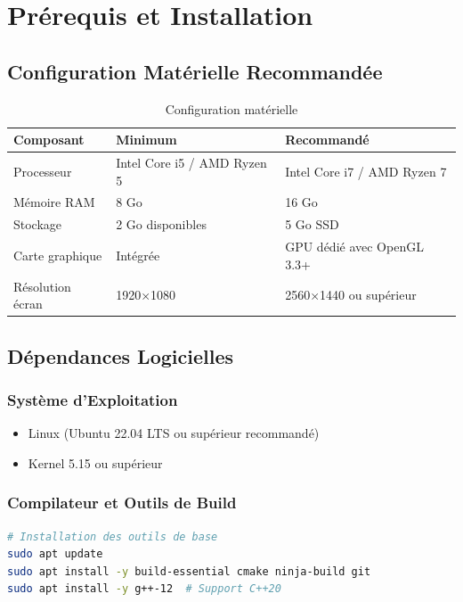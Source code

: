\documentclass[12pt,a4paper]{article}
\begin{document}
\section{Prérequis et Installation}

\subsection{Configuration Matérielle Recommandée}

\begin{table}[H]
\centering
\begin{tabular}{lll}
\toprule
\textbf{Composant} & \textbf{Minimum} & \textbf{Recommandé} \\
\midrule
Processeur & Intel Core i5 / AMD Ryzen 5 & Intel Core i7 / AMD Ryzen 7 \\
Mémoire RAM & 8 Go & 16 Go \\
Stockage & 2 Go disponibles & 5 Go SSD \\
Carte graphique & Intégrée & GPU dédié avec OpenGL 3.3+ \\
Résolution écran & 1920×1080 & 2560×1440 ou supérieur \\
\bottomrule
\end{tabular}
\caption{Configuration matérielle}
\end{table}

\subsection{Dépendances Logicielles}

\subsubsection{Système d'Exploitation}
\begin{itemize}
    \item Linux (Ubuntu 22.04 LTS ou supérieur recommandé)
    \item Kernel 5.15 ou supérieur
\end{itemize}

\subsubsection{Compilateur et Outils de Build}
\begin{lstlisting}[language=bash]
# Installation des outils de base
sudo apt update
sudo apt install -y build-essential cmake ninja-build git
sudo apt install -y g++-12  # Support C++20
\end{lstlisting}
\end{document}
